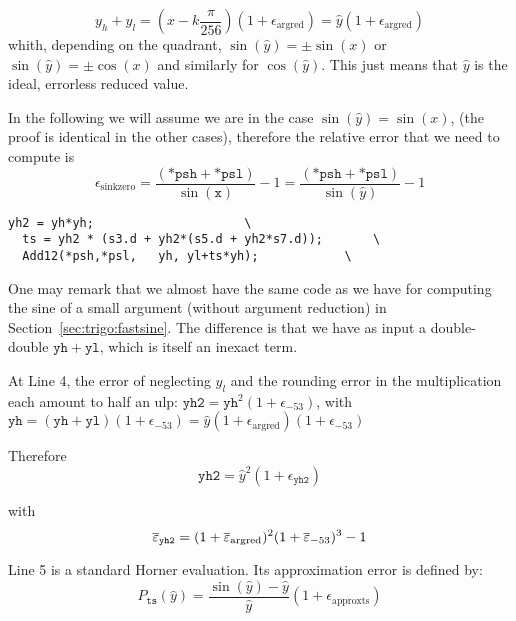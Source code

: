 \begin{equation}
  y_h+y_l = (x-k\frac{\pi}{256})(1+\epsilon_{\mathrm{argred}}) 
  = \hat{y}(1+\epsilon_{\mathrm{argred}})
  \label{eq:sinargrederror1}
\end{equation}
whith, depending on the quadrant, $\sin(\hat{y}) = \pm\sin(x)$ or
$\sin(\hat{y}) = \pm\cos(x)$ and similarly for $\cos(\hat{y})$. This
just means that $\hat{y}$ is the ideal, errorless reduced value.


In the following we will
assume we are in the case $\sin(\hat{y}) = \sin(x)$, (the proof is
identical in the other cases), therefore the relative error that we need
to compute is
\begin{equation}
  \epsilon_{\mathrm{sinkzero}} = \frac{(\mathtt{*psh} + \mathtt{*psl})}{\sin(\mathtt{x})} -1 = \frac{(\mathtt{*psh} + \mathtt{*psl})}{\sin(\hat{y})} -1
\end{equation}


 \begin{lstlisting}[caption={DoSinZero},firstnumber=1]
  yh2 = yh*yh;					   \
  ts = yh2 * (s3.d + yh2*(s5.d + yh2*s7.d));	   \
  Add12(*psh,*psl,   yh, yl+ts*yh);	           \
\end{lstlisting}

One may remark that we almost have the same code as we have for
computing the sine of a small argument (without argument reduction) in
Section~\ref{sec:trigo:fastsine}. The difference is that we have as
input a double-double $\mathtt{yh}+\mathtt{yl}$, which is itself an
inexact term.

At Line 4, the error of neglecting $y_l$ and the rounding error in the
multiplication each amount to half an ulp:
  $\mathtt{yh2}=\mathtt{yh}^2(1+\epsilon_{-53})$, 
 with $\mathtt{yh} = (\mathtt{yh}+\mathtt{yl})(1+\epsilon_{-53}) = \hat{y}(1+\epsilon_{\mathrm{argred}})(1+\epsilon_{-53})$

Therefore
\begin{equation}
  \mathtt{yh2}=\hat{y}^2(1+\epsilon_{\mathtt{yh2}})
\end{equation}

with
\begin{equation}
  {\overline{\varepsilon}}_{\mathtt{yh2}} = (1+{\overline{\varepsilon}}_{\mathrm{argred}})^2(1+{\overline{\varepsilon}}_{-53})^3 - 1
\end{equation}

Line 5 is a standard Horner evaluation. Its approximation error is defined by: 
$$
P_{\mathtt{ts}}(\hat{y}) = \frac{\sin(\hat{y})-\hat{y}}{\hat{y}}(1+\epsilon_{\mathrm{approxts}})
$$

